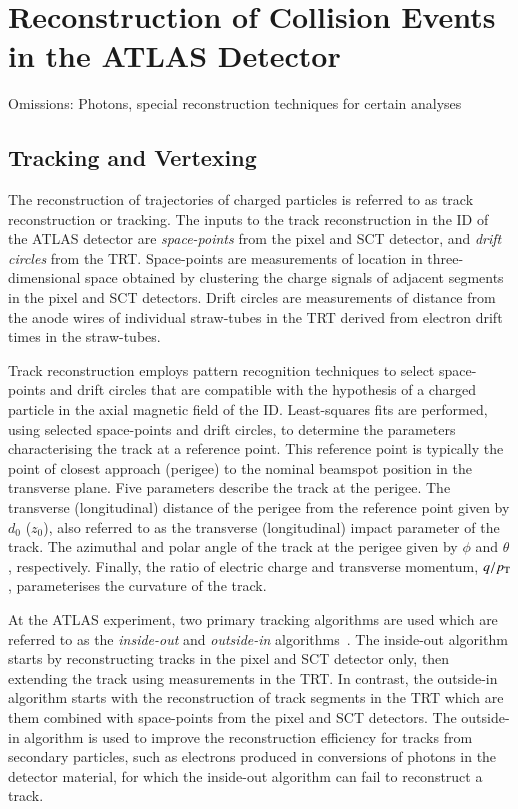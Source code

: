 \section{Reconstruction of Collision Events in the ATLAS Detector}%
\label{sec:object_reco_at_atlas}


Omissions: Photons, special reconstruction techniques for certain analyses


\subsection{Tracking and Vertexing}

The reconstruction of trajectories of charged particles is referred to as track
reconstruction or tracking. The inputs to the track reconstruction in the ID of
the ATLAS detector are \emph{space-points} from the pixel and SCT detector, and
\emph{drift circles} from the TRT. Space-points are measurements of location in
three-dimensional space obtained by clustering the charge signals of adjacent
segments in the pixel and SCT detectors. Drift circles are measurements of
distance from the anode wires of individual straw-tubes in the TRT derived from
electron drift times in the straw-tubes.

Track reconstruction employs pattern recognition techniques to select
space-points and drift circles that are compatible with the hypothesis of a
charged particle in the axial magnetic field of the ID. Least-squares fits are
performed, using selected space-points and drift circles, to determine the
parameters characterising the track at a reference point. This reference point
is typically the point of closest approach (perigee) to the nominal beamspot
position in the transverse plane. Five parameters describe the track at the
perigee. The transverse (longitudinal) distance of the perigee from the
reference point given by $d_0$ ($z_0$), also referred to as the transverse
(longitudinal) impact parameter of the track. The azimuthal and polar angle of
the track at the perigee given by $\phi$ and $\theta$, respectively. Finally,
the ratio of electric charge and transverse momentum, $q / p_{\text{T}}$, parameterises
the curvature of the track.

At the ATLAS experiment, two primary tracking algorithms are used which are
referred to as the \emph{inside-out} and \emph{outside-in}
algorithms~\cite{Cornelissen:2007vba,Salzburger:2015sgq,PERF-2015-08}. The
inside-out algorithm starts by reconstructing tracks in the pixel and SCT
detector only, then extending the track using measurements in the TRT. In
contrast, the outside-in algorithm starts with the reconstruction of track
segments in the TRT which are them combined with space-points from the pixel and
SCT detectors. The outside-in algorithm is used to improve the reconstruction
efficiency for tracks from secondary particles, such as electrons produced in
conversions of photons in the detector material, for which the inside-out
algorithm can fail to reconstruct a track.

